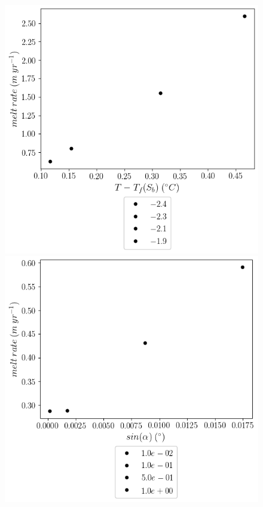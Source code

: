 \documentclass[draft]{styles/agujournal2019}
\begin{document}
\begin{figure}
    \centering
    \begin{minipage}{0.5\textwidth}
        \includegraphics[trim={0 3.5cm 0 0},clip,width=\textwidth]{Figures/melt_dT_tav12.png}
    \end{minipage}%
    \begin{minipage}{0.5\textwidth}
        \includegraphics[trim={0 3.5cm 0 0},clip,width=\textwidth]{Figures/melt_dslope_tav12.png}

\end{minipage}
\end{figure}
\end{document}
